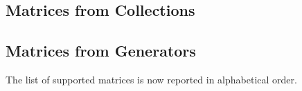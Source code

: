 \documentclass[11pt,relax]{SANDreport}
\begin{document}
\subsection{Matrices from Collections}

\subsection{Matrices from Generators}

The list of supported matrices is now reported in alphabetical order.
\end{document}

